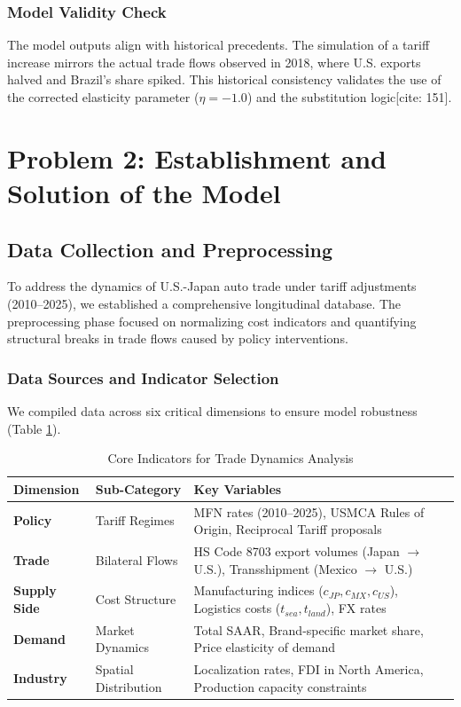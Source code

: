 \documentclass{apmcmthesis}
\begin{document}
\subsubsection{Model Validity Check}
The model outputs align with historical precedents. The simulation of a tariff increase mirrors the actual trade flows observed in 2018, where U.S. exports halved and Brazil's share spiked. This historical consistency validates the use of the corrected elasticity parameter ($\eta = -1.0$) and the substitution logic[cite: 151].



\section{Problem 2: Establishment and Solution of the Model}

\subsection{Data Collection and Preprocessing}
To address the dynamics of U.S.-Japan auto trade under tariff adjustments (2010--2025), we established a comprehensive longitudinal database. The preprocessing phase focused on normalizing cost indicators and quantifying structural breaks in trade flows caused by policy interventions.

\subsubsection{Data Sources and Indicator Selection}
We compiled data across six critical dimensions to ensure model robustness (Table \ref{tab:q2_data_indicators}).

\begin{table}[H]
\centering
\caption{Core Indicators for Trade Dynamics Analysis}
\begin{tabular}{l>{\raggedright\arraybackslash}p{3.5cm}>{\raggedright\arraybackslash}p{7.5cm}}
\toprule
\textbf{Dimension} & \textbf{Sub-Category} & \textbf{Key Variables} \\
\midrule
\textbf{Policy} & Tariff Regimes & MFN rates (2010--2025), USMCA Rules of Origin, Reciprocal Tariff proposals \\
\textbf{Trade} & Bilateral Flows & HS Code 8703 export volumes (Japan $\to$ U.S.), Transshipment (Mexico $\to$ U.S.) \\
\textbf{Supply Side} & Cost Structure & Manufacturing indices ($c_{JP}, c_{MX}, c_{US}$), Logistics costs ($t_{sea}, t_{land}$), FX rates \\
\textbf{Demand} & Market Dynamics & Total SAAR, Brand-specific market share, Price elasticity of demand \\
\textbf{Industry} & Spatial Distribution & Localization rates, FDI in North America, Production capacity constraints \\
\bottomrule
\end{tabular}
\label{tab:q2_data_indicators}
\end{table}
\end{document}
